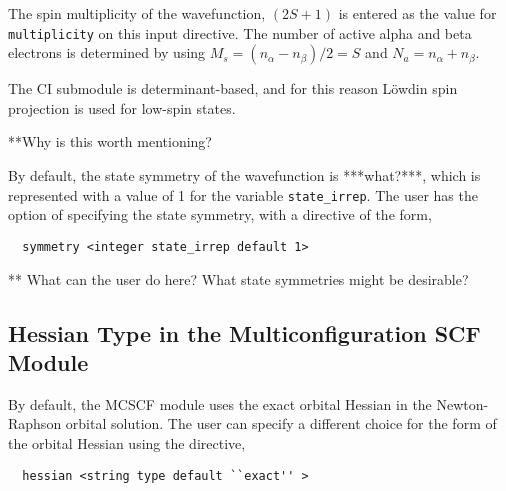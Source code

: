 The spin multiplicity of the wavefunction, $(2S + 1)$ is entered as the
value for \verb+multiplicity+ on this input directive. The number
of active alpha and beta electrons is determined by using $M_{s} =
(n_{\alpha} - n_{\beta})/2 = S$ and $N_{a} = n_{\alpha} + n_{\beta}$.

The CI submodule is determinant-based, and for this reason L\"owdin spin
projection is used for low-spin states.

\Large
**Why is this worth mentioning?
\normalsize


By default, the state symmetry of the wavefunction is ***what?***, which is
represented with a value of 1 for the variable \verb+state_irrep+.  The
user has the option of specifying the state symmetry, with a directive of
the form,

\begin{verbatim}
  symmetry <integer state_irrep default 1>
\end{verbatim}

\Large*** What can the user do here?  What state symmetries might be
desirable?
\normalsize
  


\subsection{Hessian Type in the Multiconfiguration SCF Module}


By default, the MCSCF module uses the exact orbital Hessian in the Newton-
Raphson orbital solution.  The user can specify a different choice for the form
of the orbital Hessian using the directive,

\begin{verbatim}
  hessian <string type default ``exact'' >
\end{verbatim}

